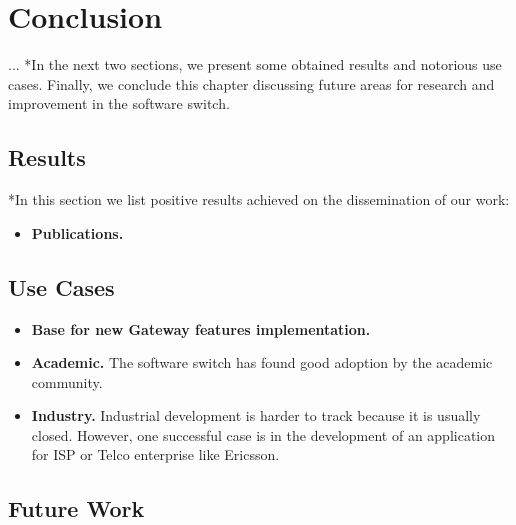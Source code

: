 \chapter{Conclusion}
\label{cap:conclusion}

...
*In the next two sections, we present some obtained results and notorious use cases. Finally, we conclude this chapter discussing future areas for research and improvement in the software switch.     

\section{Results}
\label{sec:results}

*In this section we list positive results achieved on the dissemination of our work:  

\begin{itemize}

\item \textbf{Publications.} 
\end{itemize}


\section{Use Cases}
\label{sec:cases}


\begin{itemize}
\item \textbf{Base for new Gateway  features implementation.} 

\item \textbf{Academic.} The software switch has found good adoption by the academic community. 

\item \textbf{Industry.} Industrial development is harder to track because it is usually closed. However, one successful case is in the development of an application for ISP or Telco enterprise like Ericsson. 

\end{itemize}

\section{Future Work}

  




